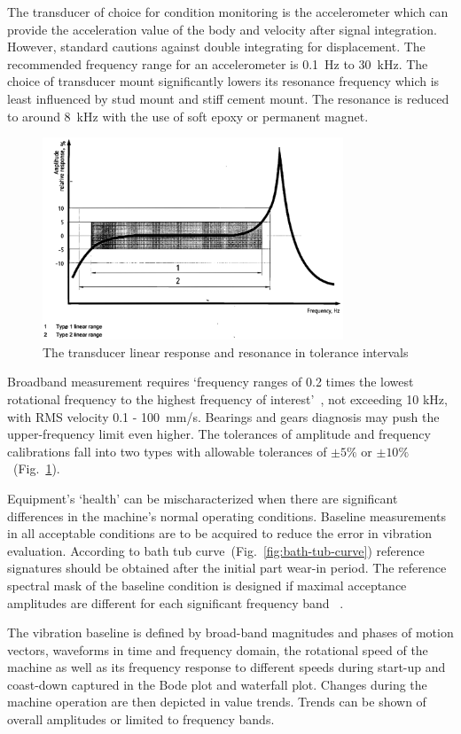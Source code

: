 The transducer of choice for condition monitoring is the accelerometer which can provide the acceleration value of the body and velocity after signal integration. However, standard cautions against double integrating for displacement. The recommended frequency range for an accelerometer is 0.1~Hz to 30~kHz. The choice of transducer mount significantly lowers its resonance frequency which is least influenced by stud mount and stiff cement mount. The resonance is reduced to around 8~kHz with the use of soft epoxy or permanent magnet.

\begin{figure}[h]
	\centering
	\includegraphics[width=0.8\textwidth]{assets/transducer-response.png}
	\caption{The transducer linear response and resonance in tolerance intervals~\cite{noauthor_iso_2002}}
	\label{fig:tranducer-response}
\end{figure}

Broadband measurement requires `frequency ranges of 0.2 times the lowest rotational frequency to the highest frequency of interest'~\cite{noauthor_iso_2002}, not exceeding 10 kHz, with RMS velocity 0.1 - 100~mm/s. Bearings and gears diagnosis may push the upper-frequency limit even higher. The tolerances of amplitude and frequency calibrations fall into two types with allowable tolerances of $\pm 5 \%$ or $\pm 10 \%$~(Fig.~\ref{fig:tranducer-response}).

Equipment's `health' can be mischaracterized when there are significant differences in the machine's normal operating conditions. Baseline measurements in all acceptable conditions are to be acquired to reduce the error in vibration evaluation. According to bath tub curve~(Fig.~\ref{fig:bath-tub-curve}) reference signatures should be obtained after the initial part wear-in period. The reference spectral mask of the baseline condition is designed if maximal acceptance amplitudes are different for each significant frequency band ~\cite{ziaran_technicka_2013}.

The vibration baseline is defined by broad-band magnitudes and phases of motion vectors, waveforms in time and frequency domain, the rotational speed of the machine as well as its frequency response to different speeds during start-up and coast-down captured in the Bode plot and waterfall plot. Changes during the machine operation are then depicted in value trends. Trends can be shown of overall amplitudes or limited to frequency bands.
